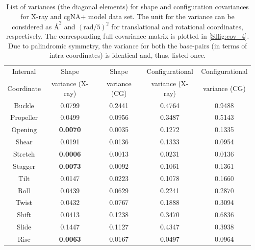 \begin{table}[H]
\begin{tabular}{ccccc}
Internal  & Shape  & Shape  & Configurational  & Configurational \\
 Coordinate &  variance (X-ray) & variance (CG) &  variance (X-ray) &  variance (CG) \\
\hline
\hline
Buckle & 0.0799 & 0.2441 & 0.4764 & 0.9488 \\
Propeller & 0.0499 & 0.0956 & 0.3487 & 0.5143 \\
Opening & \textbf{0.0070} & 0.0035 & 0.1272 & 0.1335 \\
Shear & 0.0191 & 0.0136 & 0.1333 & 0.0954 \\
Stretch & \textbf{0.0006} & 0.0013 & 0.0231 & 0.0136 \\
Stagger &  \textbf{0.0073} & 0.0092 &  0.1061 &  0.1361 \\
\hline
Tilt & 0.0147 &  0.0223 & 0.1078 & 0.1660  \\
Roll &  0.0439 &  0.0629 &  0.2241 &  0.2870  \\
Twist &  0.0432  &  0.0767  &   0.1888 & 0.3094 \\
Shift & 0.0413  & 0.1238  & 0.3470  &  0.6836  \\
Slide &  0.1447 &  0.1127  &  0.4347 & 0.3938  \\
Rise  & \textbf{0.0063}   & 0.0167  &  0.0497  &    0.0964 

\end{tabular}
\caption{List of variances (the diagonal elements) for shape and configuration covariances for X-ray and cgNA$+$ model data set. The unit for the variance can be considered as $\text{\AA}^2$  and $(\text{rad}/5)^2$ for 
translational and rotational coordinates, respectively. The corresponding full covariance matrix is plotted in \cref{SIfig:cov_4}. Due to palindromic symmetry, the variance for both the base-pairs (in terms of intra coordinates) is identical and, thus, listed once. 
}
\label{tab:var_table}
\end{table}


